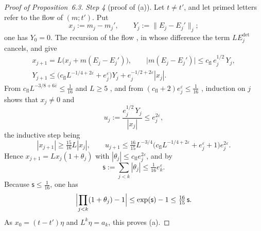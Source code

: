 \documentclass[11pt,letterpaper,reqno]{amsart}
\theoremstyle{definition}
\begin{document}
\begin{proof}[Proof of Proposition~6.3]
\emph{Step 4} (proof of (a)).
Let $t\ne t'$, and let primed letters refer to the flow of $(m;t')$.
Put
\begin{equation*}
x_j:=m_j-m_j',\qquad Y_j:=\|E_j-E_j'\|_j ;
\end{equation*}
one has $Y_0=0$.
The recursion of the flow \cite[Section~I.5.7, paragraph ``Flows'']{QEDIII}, in whose difference the term $LE^{\det}_j$ cancels, and \cite[Propositions~48.2\,(a), (b), 48.5\,(a), (b), 24.1\,(e)]{QEDIII} give
\begin{gather*}
x_{j+1}=L\bigl(x_j+m(E_j-E_j')\bigr),\qquad\bigl|m(E_j-E_j')\bigr|\le c_{\mathrm{fl}}\,e_j^{1/2}\,Y_j,\\
Y_{j+1}\le\bigl(c_{\mathrm{fl}}L^{-1/4+2\varepsilon}+e_j^{\varepsilon}\bigr)Y_j+e_j^{-1/2+2\varepsilon}|x_j| .
\end{gather*}
From $c_{\mathrm{fl}}L^{-3/8+6\bar\varepsilon}\le\frac1{16}$ and $L\ge5$ \cite[Proposition~14.2\,(b), rows (L2), (L5)]{QEDIII}, and from $(c_{\mathrm{fl}}+2)e_j^{\varepsilon}\le\frac1{16}$ \cite[(fl)]{QEDIII}, induction on $j$ shows that $x_j\ne0$ and
\begin{equation*}
u_j:=\frac{e_j^{1/2}\,Y_j}{|x_j|}\le e_j^{2\varepsilon},
\end{equation*}
the inductive step being
\begin{equation*}
|x_{j+1}|\ge\tfrac{15}{16}L|x_j|,\qquad u_{j+1}\le\tfrac{16}{15}L^{-3/4}\bigl(c_{\mathrm{fl}}L^{-1/4+2\varepsilon}+e_j^{\varepsilon}+1\bigr)e_j^{2\varepsilon}.
\end{equation*}
Hence $x_{j+1}=Lx_j(1+\theta_j)$ with $|\theta_j|\le c_{\mathrm{fl}}e_j^{2\varepsilon}$, and by \cite[(fl)]{QEDIII}
\begin{equation*}
\mathsf s:=\sum_{j<k}|\theta_j|\le\tfrac1{16}e_k^{\varepsilon}.
\end{equation*}
Because $\mathsf s\le\frac1{16}$, one has
\begin{equation*}
\Bigl|\prod_{j<k}(1+\theta_j)-1\Bigr|\le\exp(\mathsf s)-1\le\tfrac{16}{15}\,\mathsf s .
\end{equation*}
As $x_0=(t-t')\eta$ and $L^k\eta=a_k$, this proves (a).


\end{proof}
\end{document}
